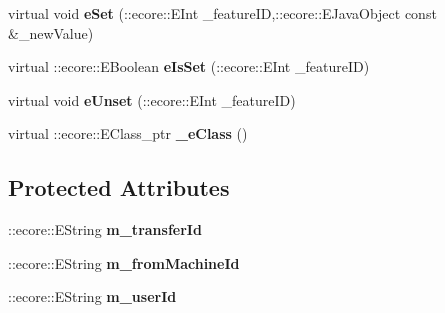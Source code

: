 \begin{DoxyCompactItemize}
\item 
\hypertarget{classFMS__Data_1_1StopTransferOptions_a5a46b04a35b5b7f19a5fced84cfb330d}{
virtual void {\bfseries eSet} (::ecore::EInt \_\-featureID,::ecore::EJavaObject const \&\_\-newValue)}
\label{classFMS__Data_1_1StopTransferOptions_a5a46b04a35b5b7f19a5fced84cfb330d}

\item 
\hypertarget{classFMS__Data_1_1StopTransferOptions_ad89534fc5a35dcbee9d760a9184e3979}{
virtual ::ecore::EBoolean {\bfseries eIsSet} (::ecore::EInt \_\-featureID)}
\label{classFMS__Data_1_1StopTransferOptions_ad89534fc5a35dcbee9d760a9184e3979}

\item 
\hypertarget{classFMS__Data_1_1StopTransferOptions_a1f9a41e85ecca33c195b927d5e8cd240}{
virtual void {\bfseries eUnset} (::ecore::EInt \_\-featureID)}
\label{classFMS__Data_1_1StopTransferOptions_a1f9a41e85ecca33c195b927d5e8cd240}

\item 
\hypertarget{classFMS__Data_1_1StopTransferOptions_ad320e09e2275e9195632d2379462d865}{
virtual ::ecore::EClass\_\-ptr {\bfseries \_\-eClass} ()}
\label{classFMS__Data_1_1StopTransferOptions_ad320e09e2275e9195632d2379462d865}

\end{DoxyCompactItemize}
\subsection*{Protected Attributes}
\begin{DoxyCompactItemize}
\item 
\hypertarget{classFMS__Data_1_1StopTransferOptions_afb93ee56f268cb596228d876d308a577}{
::ecore::EString {\bfseries m\_\-transferId}}
\label{classFMS__Data_1_1StopTransferOptions_afb93ee56f268cb596228d876d308a577}

\item 
\hypertarget{classFMS__Data_1_1StopTransferOptions_ad284e9cff5b75a05f4b866b6f5ff1a4f}{
::ecore::EString {\bfseries m\_\-fromMachineId}}
\label{classFMS__Data_1_1StopTransferOptions_ad284e9cff5b75a05f4b866b6f5ff1a4f}

\item 
\hypertarget{classFMS__Data_1_1StopTransferOptions_a19e602172678a6ab15c5d25e60b752ef}{
::ecore::EString {\bfseries m\_\-userId}}
\label{classFMS__Data_1_1StopTransferOptions_a19e602172678a6ab15c5d25e60b752ef}

\end{DoxyCompactItemize}


